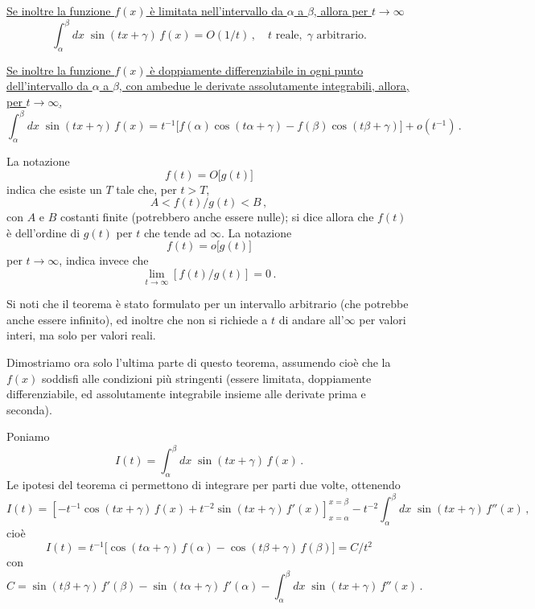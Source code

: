 \documentclass[11pt, a4paper]{book}
\numberwithin{equation}{section}
\begin{document}
\underline{Se inoltre la funzione $f(x)$ è limitata nell'intervallo da $\alpha$ a $\beta$, allora per $t\to\infty$}
\begin{equation}
  \int_\alpha^\beta dx\;\sin(tx+\gamma)\,f(x) = O(1/t)\,,
  \quad t \text{ reale},\; \gamma \text{ arbitrario.} \tag{5}
\end{equation}

\underline{Se inoltre la funzione $f(x)$ è doppiamente differenziabile in ogni punto dell'intervallo da $\alpha$ a $\beta$, con ambedue le derivate assolutamente integrabili, allora, per $t\to\infty$,}
\begin{equation}
  \int_\alpha^\beta dx\;\sin(tx+\gamma)\,f(x)
  = t^{-1}\bigl[f(\alpha)\cos(t\alpha+\gamma) - f(\beta)\cos(t\beta+\gamma)\bigr]
  + o(t^{-1})\,. \tag{6}
\end{equation}

La notazione
\[
  f(t) = O\bigl[g(t)\bigr]
\]
indica che esiste un $T$ tale che, per $t > T$,
\[
  A < f(t)/g(t) < B\,,
\]
con $A$ e $B$ costanti finite (potrebbero anche essere nulle); si dice allora che $f(t)$ è dell'ordine di $g(t)$ per $t$ che tende ad $\infty$. La notazione
\[
  f(t) = o\bigl[g(t)\bigr]
\]
per $t\to\infty$, indica invece che
\[
  \lim_{t\to\infty}\left[f(t)/g(t)\right] = 0\,.
\]

Si noti che il teorema è stato formulato per un intervallo arbitrario (che potrebbe anche essere infinito), ed inoltre che non si richiede a $t$ di andare all'$\infty$ per valori interi, ma solo per valori reali.

Dimostriamo ora solo l'ultima parte di questo teorema, assumendo cioè che la $f(x)$ soddisfi alle condizioni più stringenti (essere limitata, doppiamente differenziabile, ed assolutamente integrabile insieme alle derivate prima e seconda).

Poniamo
\begin{equation}
  I(t) = \int_\alpha^\beta dx\;\sin(tx+\gamma)\,f(x)\,. \tag{7}
\end{equation}
Le ipotesi del teorema ci permettono di integrare per parti due volte, ottenendo
\begin{equation}
  I(t) = \left[-t^{-1}\cos(tx+\gamma)\,f(x) + t^{-2}\sin(tx+\gamma)\,f'(x)\right]_{x=\alpha}^{x=\beta}
  - t^{-2}\int_\alpha^\beta dx\;\sin(tx+\gamma)\,f''(x)\,, \tag{8a}
\end{equation}
cioè
\begin{equation}
  I(t) = t^{-1}\bigl[\cos(t\alpha+\gamma)\,f(\alpha) - \cos(t\beta+\gamma)\,f(\beta)\bigr]
  = C/t^2 \tag{8b}
\end{equation}
con
\begin{equation}
  C = \sin(t\beta+\gamma)\,f'(\beta) - \sin(t\alpha+\gamma)\,f'(\alpha)
  - \int_\alpha^\beta dx\;\sin(tx+\gamma)\,f''(x)\,. \tag{9}
\end{equation}
\end{document}
